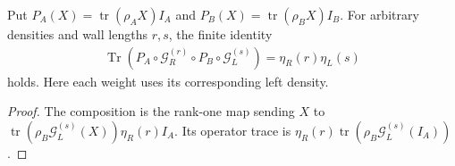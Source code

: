 \begin{lemma}
    \label{lem:uncle_wall_rank_one_contraction}
    \leanok
    Put $P_A(X)=\operatorname{tr}(\rho_AX)I_A$ and
    $P_B(X)=\operatorname{tr}(\rho_BX)I_B$. For arbitrary densities
    and wall lengths $r,s$, the finite identity
    \begin{align}
        \operatorname{Tr}(P_A\circ\mathcal G_R^{(r)}
        \circ P_B\circ\mathcal G_L^{(s)})=
        \eta_R(r)\eta_L(s)
        \label{eq:uncle_wall_rank_one_trace}
    \end{align}
    holds. Here each weight uses its corresponding left density.
\end{lemma}
\begin{proof}
    \leanok
    The composition is the rank-one map sending $X$ to
    $\operatorname{tr}(\rho_B\mathcal G_L^{(s)}(X))
        \eta_R(r)I_A$. Its operator trace is
    $\eta_R(r)\operatorname{tr}(\rho_B\mathcal G_L^{(s)}(I_A))$.
\end{proof}
